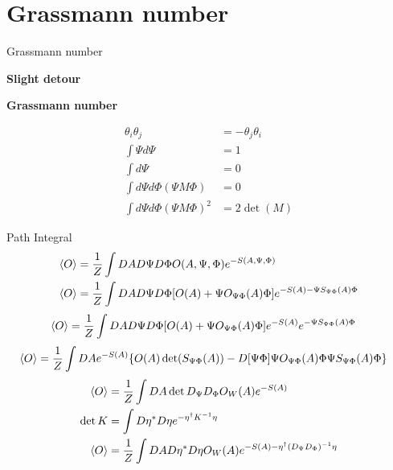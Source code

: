 \documentclass[10pt]{beamer}
\begin{document}
 \section{Grassmann number}
 \begin{frame}{Grassmann number}
     \begin{center} \textbf{Slight detour} \end{center}
     \begin{center} \textbf{Grassmann number}\end{center} \begin{align*}
    \theta_i\theta_j &= -\theta_j\theta_i \\
    \int \Psi d\Psi & = 1\\
    \int d\Psi & = 0 \\
    \int d\Psi d\Phi {(\Psi M \Phi)} & = 0\\
    \int d\Psi d\Phi {(\Psi M \Phi)}^2 & = 2 \det(M)
    \end{align*} 
  \end{frame}

  \begin{frame}{Path Integral}
    \begin{align*}
        \braket{O} &= \frac{1}{Z}\int DA D\Psi D\Phi O(A,\Psi,\Phi)e^{-S(A,\Psi,\Phi)}\\
        \braket{O} &= \frac{1}{Z}\int DA D\Psi D\Phi [O(A) + \Psi O_{\Psi\Phi}(A)\Phi]e^{-S(A) - \Psi S_{\Psi\Phi}(A)\Phi}
    \end{align*}
    \begin{align*}
        \braket{O} &= \frac{1}{Z}\int DA D\Psi D\Phi [O(A) + \Psi O_{\Psi\Phi}(A)\Phi]e^{-S(A)} e^{- \Psi S_{\Psi\Phi}(A)\Phi}
    \end{align*}
    \begin{align*}
    \braket{O} &= \frac{1}{Z}\int DA e^{-S(A)}   \{ O(A)\det(S_{\Psi\Phi}(A)) -D[\Psi\Phi] \Psi O_{\Psi\Phi}(A)\Phi\Psi S_{\Psi\Phi}(A)\Phi\}
    \end{align*}
    \begin{align}\label{eqn:lecturenote}
        \braket{O} &= \frac{1}{Z}\int DA \det D_{\Psi}D_{\Phi} O_W(A)  e^{-S(A)} \\
        \det K &= \int D\eta^* D\eta e^{-\eta^\dagger K^{-1}\eta} \nonumber \\
        \braket{O} &= \frac{1}{Z}\int DA D\eta^*D\eta O_W(A)  e^{-S(A) - \eta^\dagger (D_{\Psi}D_{\Phi})^{-1} \eta} 
    \end{align}
  \end{frame}
\end{document}
